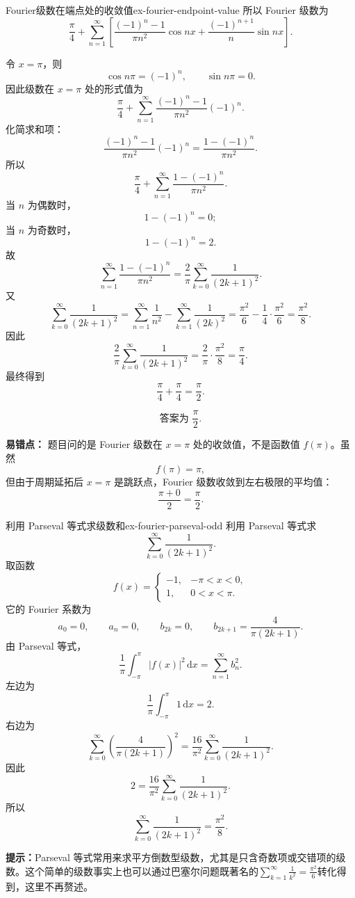 \documentclass[UTF8,zihao=-4,openany]{ctexbook}
\begin{document}
\begin{example}{Fourier级数在端点处的收敛值}{ex-fourier-endpoint-value}
所以 Fourier 级数为
\[
\frac{\pi}{4}
+
\sum_{n=1}^{\infty}
\left[
\frac{(-1)^n-1}{\pi n^2}\cos nx
+
\frac{(-1)^{n+1}}{n}\sin nx
\right].
\]

令 $x=\pi$，则
\[
\cos n\pi=(-1)^n,\qquad \sin n\pi=0.
\]
因此级数在 $x=\pi$ 处的形式值为
\[
\frac{\pi}{4}
+
\sum_{n=1}^{\infty}
\frac{(-1)^n-1}{\pi n^2}(-1)^n.
\]
化简求和项：
\[
\frac{(-1)^n-1}{\pi n^2}(-1)^n
=
\frac{1-(-1)^n}{\pi n^2}.
\]
所以
\[
\frac{\pi}{4}
+
\sum_{n=1}^{\infty}
\frac{1-(-1)^n}{\pi n^2}.
\]
当 $n$ 为偶数时，
\[
1-(-1)^n=0;
\]
当 $n$ 为奇数时，
\[
1-(-1)^n=2.
\]
故
\[
\sum_{n=1}^{\infty}
\frac{1-(-1)^n}{\pi n^2}
=
\frac{2}{\pi}\sum_{k=0}^{\infty}\frac{1}{(2k+1)^2}.
\]
又
\[
\sum_{k=0}^{\infty}\frac{1}{(2k+1)^2}
=
\sum_{n=1}^{\infty}\frac1{n^2}
-
\sum_{k=1}^{\infty}\frac1{(2k)^2}
=
\frac{\pi^2}{6}-\frac14\cdot\frac{\pi^2}{6}
=
\frac{\pi^2}{8}.
\]
因此
\[
\frac{2}{\pi}\sum_{k=0}^{\infty}\frac{1}{(2k+1)^2}
=
\frac{2}{\pi}\cdot\frac{\pi^2}{8}
=
\frac{\pi}{4}.
\]
最终得到
\[
\frac{\pi}{4}+\frac{\pi}{4}
=
\frac{\pi}{2}.
\]

\[
\boxed{\text{答案为 }\frac{\pi}{2}.}
\]

\textbf{易错点：}
题目问的是 Fourier 级数在 $x=\pi$ 处的收敛值，不是函数值 $f(\pi)$。虽然
\[
f(\pi)=\pi,
\]
但由于周期延拓后 $x=\pi$ 是跳跃点，Fourier 级数收敛到左右极限的平均值：
\[
\frac{\pi+0}{2}=\frac{\pi}{2}.
\]
\end{example}

\begin{example}{利用 Parseval 等式求级数和}{ex-fourier-parseval-odd}
利用 Parseval 等式求
\[
  \sum_{k=0}^{\infty}\frac{1}{(2k+1)^2}.
\]
\tcblower
取函数
\[
  f(x)=
  \begin{cases}
  -1, & -\pi<x<0,\\
  1, & 0<x<\pi.
  \end{cases}
\]
它的 Fourier 系数为
\[
  a_0=0,\qquad a_n=0,\qquad
  b_{2k}=0,\qquad b_{2k+1}=\frac{4}{\pi(2k+1)}.
\]
由 Parseval 等式，
\[
  \frac{1}{\pi}\int_{-\pi}^{\pi}|f(x)|^2\,\mathrm{d}x
  =
  \sum_{n=1}^{\infty}b_n^2.
\]
左边为
\[
  \frac{1}{\pi}\int_{-\pi}^{\pi}1\,\mathrm{d}x=2.
\]
右边为
\[
  \sum_{k=0}^{\infty}
  \left(\frac{4}{\pi(2k+1)}\right)^2
  =
  \frac{16}{\pi^2}
  \sum_{k=0}^{\infty}\frac{1}{(2k+1)^2}.
\]
因此
\[
  2=
  \frac{16}{\pi^2}
  \sum_{k=0}^{\infty}\frac{1}{(2k+1)^2}.
\]
所以
\[
  \sum_{k=0}^{\infty}\frac{1}{(2k+1)^2}
  =
  \frac{\pi^2}{8}.
\]

\textbf{提示：}Parseval 等式常用来求平方倒数型级数，尤其是只含奇数项或交错项的级数。这个简单的级数事实上也可以通过巴塞尔问题既著名的\(\sum_{k=1}^{\infty}\frac{1}{k^2}=\frac{\pi^2}{6}\)转化得到，这里不再赘述。
\end{example}
\end{document}
